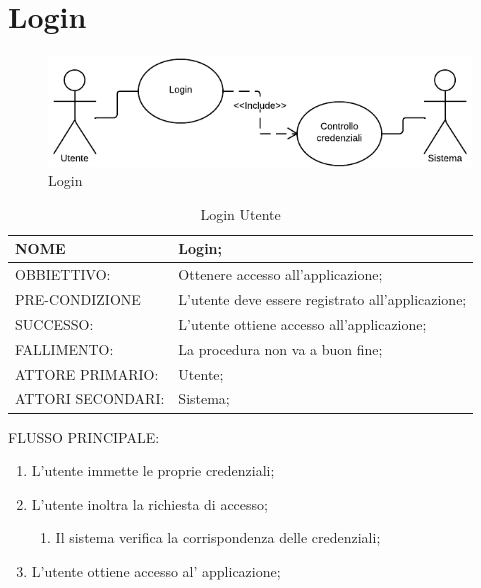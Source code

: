 \section{Login}
\begin{figure}[h!]
\centering
\includegraphics[scale=0.40]{img/use/Log.png}
\caption{Login}
\label{fig:Login}
\end{figure}
\begin{table}[H]
\begin{tabular}{p{}|p{}}
\toprule
NOME & Login;\\
\hline
OBBIETTIVO: & Ottenere accesso all'applicazione;\\
\hline
PRE-CONDIZIONE & L'utente deve essere registrato all'applicazione;\\
\hline
SUCCESSO: & L'utente ottiene accesso all'applicazione;\\
\hline
FALLIMENTO: & La procedura non va a buon fine;\\
\hline
ATTORE PRIMARIO: & Utente;\\
\hline
ATTORI SECONDARI: & Sistema;\\
\bottomrule
\end{tabular}
\caption{Login Utente}
\label{table:log}
\end{table}
FLUSSO PRINCIPALE:
\begin{enumerate}
\item L'utente immette le proprie credenziali;
\item L'utente inoltra la richiesta di accesso;
\begin{enumerate}
\item Il sistema verifica la corrispondenza delle credenziali;
\end{enumerate}
\item L'utente ottiene accesso al' applicazione;
\end{enumerate}

